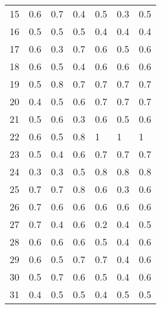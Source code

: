 \begin{table}[]
\begin{tabular}{l|lll|lll}
15              & 0.6                  & 0.7       & 0.4     & 0.5     & 0.3 & 0.5     \\
16              & 0.5                  & 0.5       & 0.5     & 0.4     & 0.4 & 0.4     \\
17              & 0.6                  & 0.3       & 0.7     & 0.6     & 0.5 & 0.6     \\
18              & 0.6                  & 0.5       & 0.4     & 0.6     & 0.6 & 0.6     \\
19              & 0.5                  & 0.8       & 0.7     & 0.7     & 0.7 & 0.7     \\
20              & 0.4                  & 0.5       & 0.6     & 0.7     & 0.7 & 0.7     \\
21              & 0.5                  & 0.6       & 0.3     & 0.6     & 0.5 & 0.6     \\
22              & 0.6                  & 0.5       & 0.8     & 1       & 1   & 1       \\
23              & 0.5                  & 0.4       & 0.6     & 0.7     & 0.7 & 0.7     \\
24              & 0.3                  & 0.3       & 0.5     & 0.8     & 0.8 & 0.8     \\
25              & 0.7                  & 0.7       & 0.8     & 0.6     & 0.3 & 0.6     \\
26              & 0.7                  & 0.6       & 0.6     & 0.6     & 0.6 & 0.6     \\
27              & 0.7                  & 0.4       & 0.6     & 0.2     & 0.4 & 0.5     \\
28              & 0.6                  & 0.6       & 0.6     & 0.5     & 0.4 & 0.6     \\
29              & 0.6                  & 0.5       & 0.7     & 0.7     & 0.4 & 0.6     \\
30              & 0.5                  & 0.7       & 0.6     & 0.5     & 0.4 & 0.6     \\
31              & 0.4                  & 0.5       & 0.5     & 0.4     & 0.5 & 0.5     \\
\end{tabular}
\end{table}
\clearpage
